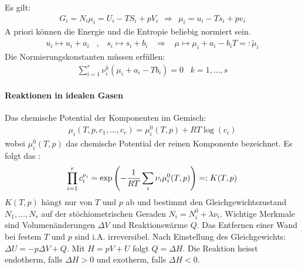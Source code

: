 \begin{bemerkung}
    Es gilt:
    \begin{align*}
        G_i = N_i \mu_i = U_i - T S_i + p V_i
        \ \ \Rightarrow \ \
        \mu_i = u_i - T s_i + p v_i
    \end{align*}
    A priori können die Energie und die Entropie beliebig normiert sein.
    \begin{align*}
        u_i \mapsto u_i + a_i
        \hspace{10pt} , \hspace{10pt}
        s_i \mapsto s_i + b_i
        \hspace{10pt} \Rightarrow \hspace{10pt}
        \mu \mapsto \mu_i + a_i - b_i T =: \tilde{\mu}_i
    \end{align*}
    Die Normierungskonstanten müssen erfüllen:
    \begin{align*}
        \sum_{i=1}^r \nu_i^k (\mu_i + a_i - T b_i) = 0
        \hspace{10pt}
        k=1,\dots,s
    \end{align*}
\end{bemerkung}

\hspace{-5pt}

\paragraph{Reaktionen in idealen Gasen}
Das chemische Potential der Komponenten im Gemisch:
\begin{align*}
    \mu_i (T,p,c_1,\dots,c_r) = \mu_i^0 (T,p) + R T \log(c_i)
\end{align*}
wobei $\mu_i^0(T,p)$ das chemische Potential der reinen Komponente bezeichnet.
Es folgt das \fat{Massenwirkungsgesetz}:
\begin{align*}
    \prod_{i=1}^r c_i^{\nu_i} =
    \exp \left( - \frac{1}{R T} \sum_i \nu_i \mu_i^0(T,p) \right)
    =: K(T,p)
\end{align*}
$K(T,p)$ hängt nur von $T$ und $p$ ab und bestimmt den Gleichgewichtszustand
$N_1,\dots,N_r$ auf der stöchiometrischen Geraden $N_i = N_i^0 + \lambda \nu_i$.
Wichtige Merkmale sind Volumenänderungen $\Delta V$ und Reaktionswärme $Q$.
Das Entfernen einer Wand bei festem $T$ und $p$ sind i.A. irreversibel. Nach
Einstellung des Gleichgewichts: $\Delta U = - p \Delta V + Q$. Mit
$H = p V + U$ folgt $Q = \Delta H$. Die Reaktion heisst endotherm, falls
$\Delta H > 0$ und exotherm, falls $\Delta H < 0$.

